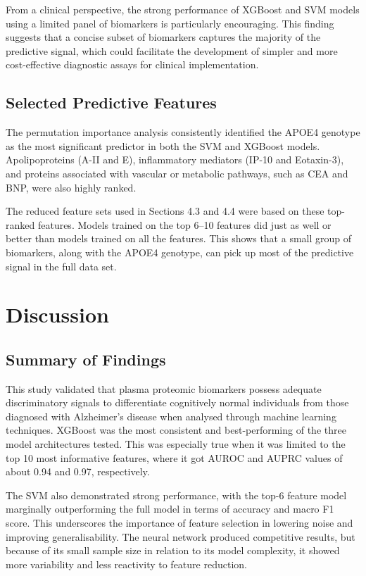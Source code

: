 \documentclass[a4paper,12pt]{article}
\begin{document}
From a clinical perspective, the strong performance of XGBoost and SVM models using a limited panel of biomarkers is particularly encouraging. This finding suggests that a concise subset of biomarkers captures the majority of the predictive signal, which could facilitate the development of simpler and more cost-effective diagnostic assays for clinical implementation.

\subsection{Selected Predictive Features}
The permutation importance analysis consistently identified the APOE4 genotype as the most significant predictor in both the SVM and XGBoost models.  Apolipoproteins (A-II and E), inflammatory mediators (IP-10 and Eotaxin-3), and proteins associated with vascular or metabolic pathways, such as CEA and BNP, were also highly ranked.

The reduced feature sets used in Sections 4.3 and 4.4 were based on these top-ranked features. Models trained on the top 6–10 features did just as well or better than models trained on all the features.  This shows that a small group of biomarkers, along with the APOE4 genotype, can pick up most of the predictive signal in the full data set.


\newpage
\section{Discussion}

\subsection{Summary of Findings}
This study validated that plasma proteomic biomarkers possess adequate discriminatory signals to differentiate cognitively normal individuals from those diagnosed with Alzheimer’s disease when analysed through machine learning techniques.  XGBoost was the most consistent and best-performing of the three model architectures tested. This was especially true when it was limited to the top 10 most informative features, where it got AUROC and AUPRC values of about 0.94 and 0.97, respectively.

The SVM also demonstrated strong performance, with the top-6 feature model marginally outperforming the full model in terms of accuracy and macro F1 score. This underscores the importance of feature selection in lowering noise and improving generalisability.  The neural network produced competitive results, but because of its small sample size in relation to its model complexity, it showed more variability and less reactivity to feature reduction.
\end{document}
